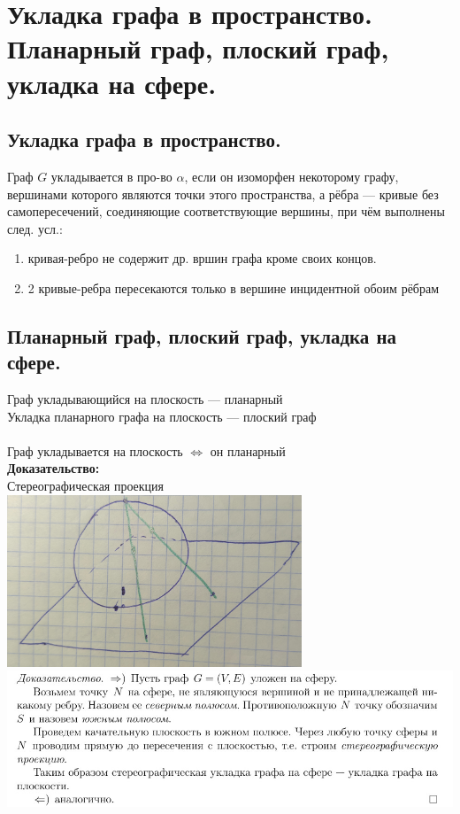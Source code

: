 \documentclass[12pt]{article}
\begin{document}
\section{Укладка графа в пространство. Планарный граф, плоский граф, укладка на сфере.}
	\subsection{Укладка графа в пространство.}
		Граф $G$ укладывается в про-во $\alpha$, если он изоморфен некоторому графу, вершинами которого являются точки этого пространства, а рёбра — кривые без самопересечений, соединяющие соответствующие вершины, при чём выполнены след. усл.:
		\begin{enumerate}
			\item кривая-ребро не содержит др. вршин графа кроме своих концов.
			\item 2 кривые-ребра пересекаются только в вершине инцидентной обоим рёбрам
		\end{enumerate}
	\subsection{Планарный граф, плоский граф, укладка на сфере.}
		Граф укладывающийся на плоскость — планарный\\
		Укладка планарного графа на плоскость — плоский граф\\\\
		Граф укладывается на плоскость $\Leftrightarrow$ он планарный\\
		\textbf{Доказательство:}\\
			Стереографическая проекция\\
			\includegraphics[width=250pt]{5}\\
			\includegraphics[width=450pt]{66}\\
		\qedsymbol
\end{document}
